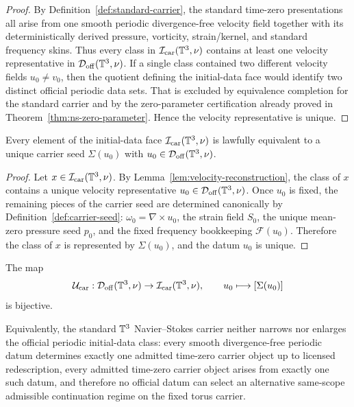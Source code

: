 \begin{proof}
By Definition~\ref{def:standard-carrier}, the standard time-zero presentations all arise from one
smooth periodic divergence-free velocity field together with its deterministically derived pressure,
vorticity, strain/kernel, and standard frequency skins. Thus every class in
$\mathcal I_{\mathrm{car}}(\mathbb{T}^3,\nu)$ contains at least one velocity representative in
$\mathcal D_{\mathrm{off}}(\mathbb{T}^3,\nu)$. If a single class contained two different velocity fields
$u_0\neq v_0$, then the quotient defining the initial-data face would identify two distinct official
periodic data sets. That is excluded by equivalence completion for the standard carrier and by the
zero-parameter certification already proved in Theorem~\ref{thm:ns-zero-parameter}. Hence the
velocity representative is unique.
\end{proof}

\begin{lemma}\label{lem:reverse-extraction}
Every element of the initial-data face $\mathcal I_{\mathrm{car}}(\mathbb{T}^3,\nu)$ is lawfully equivalent
to a unique carrier seed $\Sigma(u_0)$ with
$u_0\in\mathcal D_{\mathrm{off}}(\mathbb{T}^3,\nu)$.
\end{lemma}

\begin{proof}
Let $x\in\mathcal I_{\mathrm{car}}(\mathbb{T}^3,\nu)$. By Lemma~\ref{lem:velocity-reconstruction}, the class of
$x$ contains a unique velocity representative $u_0\in\mathcal D_{\mathrm{off}}(\mathbb{T}^3,\nu)$. Once $u_0$ is
fixed, the remaining pieces of the carrier seed are determined canonically by
Definition~\ref{def:carrier-seed}: $\omega_0=\nabla\times u_0$, the strain field $S_0$, the unique
mean-zero pressure seed $p_0$, and the fixed frequency bookkeeping $\mathcal F(u_0)$. Therefore the
class of $x$ is represented by $\Sigma(u_0)$, and the datum $u_0$ is unique.
\end{proof}

\begin{theorem}\label{thm:carrier-universality}
The map
\[
\mathcal U_{\mathrm{car}}:\mathcal D_{\mathrm{off}}(\mathbb{T}^3,\nu)\to \mathcal I_{\mathrm{car}}(\mathbb{T}^3,\nu),
\qquad
u_0\longmapsto [\Sigma(u_0)]
\]
is bijective.

Equivalently, the standard $\mathbb{T}^3$ Navier--Stokes carrier neither narrows nor enlarges the official
periodic initial-data class: every smooth divergence-free periodic datum determines exactly one
admitted time-zero carrier object up to licensed redescription, every admitted time-zero
carrier object arises from exactly one such datum, and therefore no official datum can select an
alternative same-scope admissible continuation regime on the fixed torus carrier.
\end{theorem}

